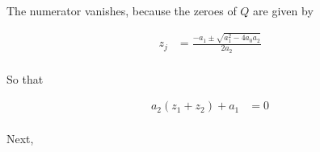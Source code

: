 \documentclass[a4paper,12pt]{article}
\begin{document}
The numerator vanishes, because the zeroes of $Q$ are given by

\begin{align*}
z_j &= \frac{-a_1 \pm \sqrt{a_1^2 -4a_0a_2}}{2a_2}\\
\end{align*}

So that

\begin{align*}
a_2(z_1+z_2) + a_1 &= 0\\ 
\end{align*}

Next, 






\shunt
\end{document}
